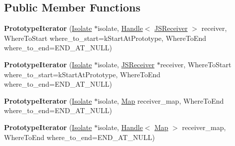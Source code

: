 \subsection*{Public Member Functions}
\begin{DoxyCompactItemize}
\item 
\mbox{\label{classv8_1_1internal_1_1PrototypeIterator_a5dd259429110e0af30e43352d3419bf2}} 
{\bfseries Prototype\+Iterator} (\mbox{\hyperlink{classv8_1_1internal_1_1Isolate}{Isolate}} $\ast$isolate, \mbox{\hyperlink{classv8_1_1internal_1_1Handle}{Handle}}$<$ \mbox{\hyperlink{classv8_1_1internal_1_1JSReceiver}{J\+S\+Receiver}} $>$ receiver, Where\+To\+Start where\+\_\+to\+\_\+start=k\+Start\+At\+Prototype, Where\+To\+End where\+\_\+to\+\_\+end=E\+N\+D\+\_\+\+A\+T\+\_\+\+N\+U\+LL)
\item 
\mbox{\label{classv8_1_1internal_1_1PrototypeIterator_a278131ccb2ce45d18344e0b3f85ea1ee}} 
{\bfseries Prototype\+Iterator} (\mbox{\hyperlink{classv8_1_1internal_1_1Isolate}{Isolate}} $\ast$isolate, \mbox{\hyperlink{classv8_1_1internal_1_1JSReceiver}{J\+S\+Receiver}} $\ast$receiver, Where\+To\+Start where\+\_\+to\+\_\+start=k\+Start\+At\+Prototype, Where\+To\+End where\+\_\+to\+\_\+end=E\+N\+D\+\_\+\+A\+T\+\_\+\+N\+U\+LL)
\item 
\mbox{\label{classv8_1_1internal_1_1PrototypeIterator_adf880fd788a35a003563c98c26f1dca7}} 
{\bfseries Prototype\+Iterator} (\mbox{\hyperlink{classv8_1_1internal_1_1Isolate}{Isolate}} $\ast$isolate, \mbox{\hyperlink{classv8_1_1internal_1_1Map}{Map}} receiver\+\_\+map, Where\+To\+End where\+\_\+to\+\_\+end=E\+N\+D\+\_\+\+A\+T\+\_\+\+N\+U\+LL)
\item 
\mbox{\label{classv8_1_1internal_1_1PrototypeIterator_a95a0dd079e26a1815756c37289577256}} 
{\bfseries Prototype\+Iterator} (\mbox{\hyperlink{classv8_1_1internal_1_1Isolate}{Isolate}} $\ast$isolate, \mbox{\hyperlink{classv8_1_1internal_1_1Handle}{Handle}}$<$ \mbox{\hyperlink{classv8_1_1internal_1_1Map}{Map}} $>$ receiver\+\_\+map, Where\+To\+End where\+\_\+to\+\_\+end=E\+N\+D\+\_\+\+A\+T\+\_\+\+N\+U\+LL)
\item 
\mbox{\label{classv8_1_1internal_1_1PrototypeIterator_a2dd20c86003a6f0502a40ed5994fbef9}} 

\end{DoxyCompactItemize}
